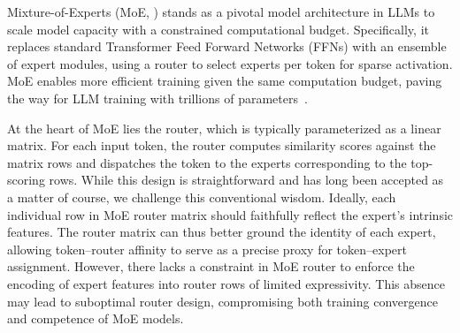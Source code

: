 \documentclass[11pt]{article}
\newcommand{\citealp}[1]{\citep{#1}}
\begin{document}
Mixture-of-Experts (MoE, \citealp{olmoe,gptoss,deepseekv4,glm5}) stands as a pivotal model architecture in LLMs to scale model capacity with a constrained computational budget.
Specifically, it replaces standard Transformer Feed Forward Networks (FFNs) with an ensemble of expert modules, using a router to select experts per token for sparse activation.
MoE enables more efficient training given the same computation budget, paving the way for LLM training with trillions of parameters~\cite{deepseekv4,k2}.

At the heart of MoE lies the router, which is typically parameterized as a linear matrix. 
For each input token, the router computes similarity scores against the matrix rows and dispatches the token to the experts corresponding to the top-scoring rows. 
While this design is straightforward and has long been accepted as a matter of course, we challenge this conventional wisdom.
Ideally, each individual row in MoE router matrix should faithfully reflect the expert's intrinsic features.
The router matrix can thus better ground the identity of each expert,
allowing token–router affinity to serve as a precise proxy for token–expert assignment.
However, there lacks a constraint in MoE router to enforce the encoding of expert features into router rows of limited expressivity.
This absence may lead to suboptimal router design, compromising both training convergence and competence of MoE models.


\end{document}
